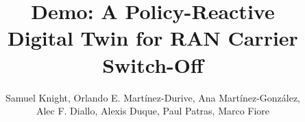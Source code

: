 \documentclass[sigconf, 10pt, review]{acmart}
\begin{document}
\title[Demo: A Policy-Reactive Digital Twin for RAN Carrier Switch-Off]{Demo: A Policy-Reactive\\Digital Twin for RAN Carrier Switch-Off}









\author[S. Knight et al.]{Samuel Knight, Orlando E. Mart\'inez-Durive, Ana Martínez-González,\\
Alec F. Diallo, Alexis Duque, Paul Patras, Marco Fiore}



\maketitle
\end{document}
